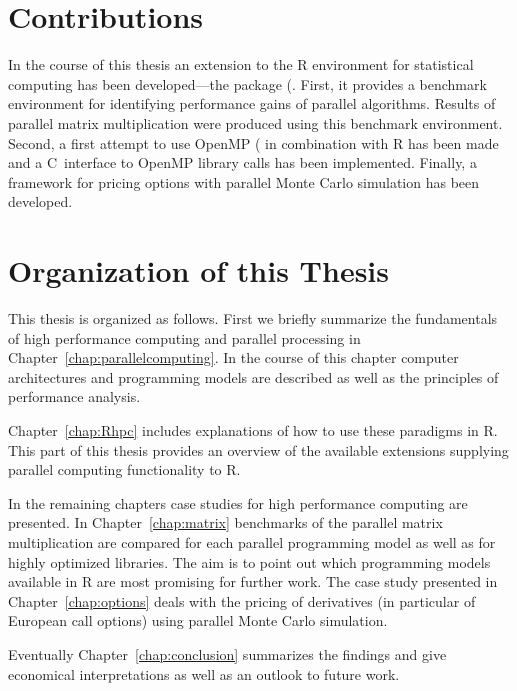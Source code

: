 \section{Contributions}
In the course of this thesis an extension to the R
environment for statistical computing has been developed---the
 package (\cite{theussl07paRc}. First, it provides a
benchmark environment for 
identifying performance gains of parallel algorithms. Results of
parallel matrix multiplication were produced using this benchmark
environment. Second, a first
attempt to use OpenMP (\cite{openMP05} in combination with R has been
made and a 
C~interface to OpenMP library calls has been implemented. Finally,
a framework for pricing options with parallel Monte Carlo simulation
has been developed.
 
\section{Organization of this Thesis}

This thesis is organized as follows. First we briefly summarize the
fundamentals of high performance computing and parallel processing in
Chapter~\ref{chap:parallelcomputing}. In the course of this chapter
computer architectures and programming models are described as well as the
principles of performance analysis.

Chapter~\ref{chap:Rhpc} includes explanations of how to use these
paradigms in R. This part of
this thesis provides an overview of the
available extensions supplying parallel computing functionality to R.

In the remaining chapters case studies for high performance
computing are presented. In Chapter~\ref{chap:matrix}
benchmarks of the parallel matrix multiplication are compared for each
parallel 
programming model as well as for highly optimized libraries. The aim
is to point out which programming models available in R are most
promising for further work.
The case study presented in Chapter~\ref{chap:options} deals with the
pricing of derivatives (in particular of European call options) using
parallel Monte Carlo simulation. 

Eventually Chapter~\ref{chap:conclusion} summarizes
the findings and give economical interpretations as well as an outlook
to future work.

